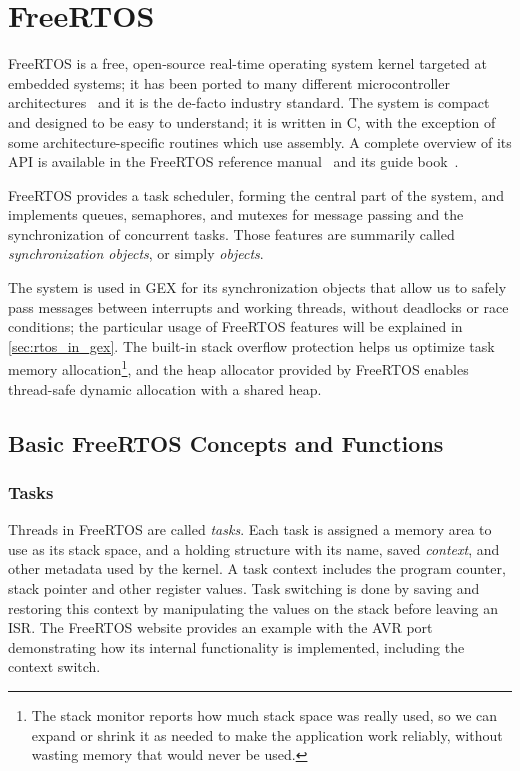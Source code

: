 \chapter{FreeRTOS} \label{sec:freertos}

FreeRTOS is a free, open-source real-time operating system kernel targeted at embedded systems; it has been ported to many different microcontroller architectures~\cite{freertos-ports-list} and it is the de-facto industry standard. The system is compact and designed to be easy to understand; it is written in C, with the exception of some architecture-specific routines which use assembly. A complete overview of its \gls{API} is available in the FreeRTOS reference manual~\cite{freertos-rm} and its guide book~\cite{freertos-book}.

FreeRTOS provides a task scheduler, forming the central part of the system, and implements queues, semaphores, and mutexes for message passing and the synchronization of concurrent tasks. Those features are summarily called \textit{synchronization objects}, or simply \textit{objects}.

The system is used in GEX for its synchronization objects that allow us to safely pass messages between interrupts and working threads, without deadlocks or race conditions; the particular usage of FreeRTOS features will be explained in \cref{sec:rtos_in_gex}. The built-in stack overflow protection helps us optimize task memory allocation\footnote{The stack monitor reports how much stack space was really used, so we can expand or shrink it as needed to make the application work reliably, without wasting memory that would never be used.}, and the heap allocator provided by FreeRTOS enables thread-safe dynamic allocation with a shared heap.

\section{Basic FreeRTOS Concepts and Functions}

\subsection{Tasks}

Threads in FreeRTOS are called \textit{tasks}. Each task is assigned a memory area to use as its stack space, and a holding structure with its name, saved \textit{context}, and other metadata used by the kernel. A task context includes the program counter, stack pointer and other register values. Task switching is done by saving and restoring this context by manipulating the values on the stack before leaving an \gls{ISR}. The FreeRTOS website provides an example with the AVR port~\cite{freertos-task-switching} demonstrating how its internal functionality is implemented, including the context switch.

